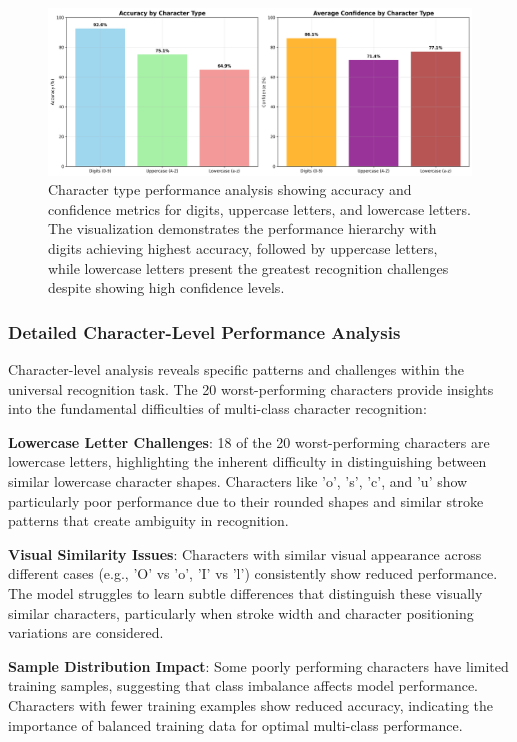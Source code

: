 \documentclass[11pt,a4paper]{report}
\begin{document}
\begin{figure}[H]
\centering
\includegraphics[width=\textwidth]{character_type_performance.png}
\caption{Character type performance analysis showing accuracy and confidence metrics for digits, uppercase letters, and lowercase letters. The visualization demonstrates the performance hierarchy with digits achieving highest accuracy, followed by uppercase letters, while lowercase letters present the greatest recognition challenges despite showing high confidence levels.}
\label{fig:character_type_performance}
\end{figure}

\subsubsection{Detailed Character-Level Performance Analysis}

Character-level analysis reveals specific patterns and challenges within the universal recognition task. The 20 worst-performing characters provide insights into the fundamental difficulties of multi-class character recognition:

\textbf{Lowercase Letter Challenges}: 18 of the 20 worst-performing characters are lowercase letters, highlighting the inherent difficulty in distinguishing between similar lowercase character shapes. Characters like 'o', 's', 'c', and 'u' show particularly poor performance due to their rounded shapes and similar stroke patterns that create ambiguity in recognition.

\textbf{Visual Similarity Issues}: Characters with similar visual appearance across different cases (e.g., 'O' vs 'o', 'I' vs 'l') consistently show reduced performance. The model struggles to learn subtle differences that distinguish these visually similar characters, particularly when stroke width and character positioning variations are considered.

\textbf{Sample Distribution Impact}: Some poorly performing characters have limited training samples, suggesting that class imbalance affects model performance. Characters with fewer training examples show reduced accuracy, indicating the importance of balanced training data for optimal multi-class performance.
\end{document}
